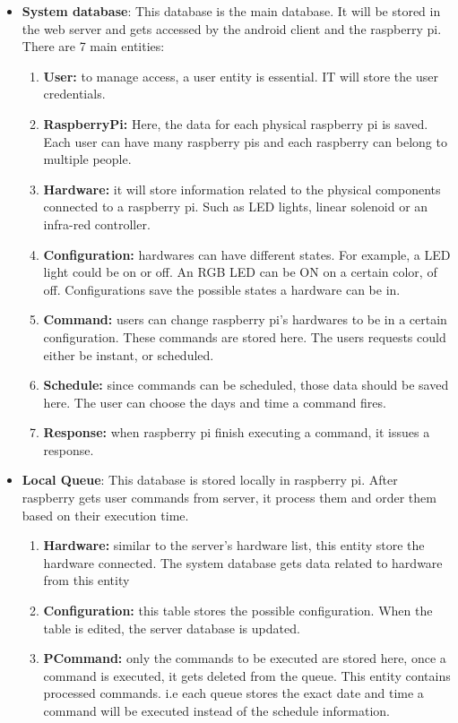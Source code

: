 \documentclass[12pt, oneside, a4paper]{book}
\newcommand\boldcolor[1]{\textcolor{bold}{\textbf{#1}}}
\begin{document}
				\begin{itemize}
					\item \boldcolor{System database}: This database is the main database. It will be stored in the web server and gets accessed by the android client and the raspberry pi. There are 7 main entities: 
					\begin{enumerate}
						\item \textbf{User:} to manage access, a user entity is essential. IT will store the user credentials. 
						\item \textbf{RaspberryPi:} Here, the data for each physical raspberry pi is saved. Each user can have many raspberry pis and each  raspberry can belong to multiple people.
						\item \textbf{Hardware:} it will store information related to the physical components connected to a raspberry pi. Such as LED lights, linear solenoid or an infra-red controller.  
						\item \textbf{Configuration:} hardwares can have different states. For example, a LED light could be on or off. An RGB LED can be ON on a certain color, of off. Configurations save the possible states a hardware can be in.
						\item \textbf{Command:} users can change raspberry pi's hardwares to be in a certain configuration. These commands are stored here. The users requests could either be instant, or scheduled. 
						\item \textbf{Schedule:} since commands can be scheduled, those data should be saved here. The user can choose the days and time a command fires.
						\item \textbf{Response:} when raspberry pi finish executing a command, it issues a response.
					\end{enumerate}
					\item \boldcolor{Local Queue}: This database is stored locally in raspberry pi. After raspberry gets user commands from server, it process them and order them based on their execution time.
					\begin{enumerate}
						\item \textbf{Hardware:} similar to the server's hardware list, this entity store the hardware connected. The system database gets data related to hardware from this entity 
						\item \textbf{Configuration:} this table stores the possible configuration. When the table is edited, the server database is updated.
						\item \textbf{PCommand:} only the commands to be executed are stored here, once a command is executed, it gets deleted from the queue. This entity contains processed commands. i.e each queue stores the exact date and time a command will be executed instead of the schedule information.
					\end{enumerate}
				\end{itemize}
			
\end{document}
